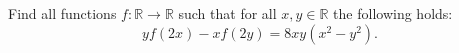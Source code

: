 Find all functions $f\colon\mathbb{R} \rightarrow \mathbb{R}$ such that
for all $x,y \in \mathbb{R}$ the following holds:
$$yf(2x)-xf(2y)=8xy(x^2-y^2).$$